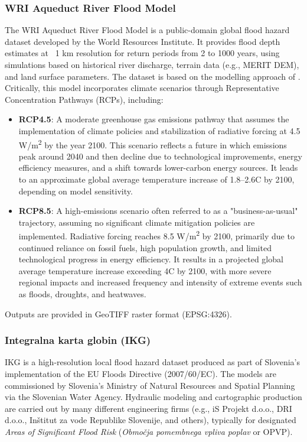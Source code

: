 \subsubsection*{WRI Aqueduct River Flood Model}
The WRI Aqueduct River Flood Model is a public-domain global flood hazard dataset developed by the World Resources Institute. It provides flood depth estimates at ~1 km resolution for return periods from 2 to 1000 years, using simulations based on historical river discharge, terrain data (e.g., MERIT DEM), and land surface parameters. The dataset is based on the modelling approach of \cite{ward_assessing_2013}. Critically, this model incorporates climate scenarios through Representative Concentration Pathways (RCPs), including:
\begin{itemize}
    \item \textbf{RCP4.5}: A moderate greenhouse gas emissions pathway that assumes the implementation of climate policies and stabilization of radiative forcing at 4.5 W/m\textsuperscript{2} by the year 2100. This scenario reflects a future in which emissions peak around 2040 and then decline due to technological improvements, energy efficiency measures, and a shift towards lower-carbon energy sources. It leads to an approximate global average temperature increase of 1.8--2.6\textdegree C by 2100, depending on model sensitivity.
    
    \item \textbf{RCP8.5}: A high-emissions scenario often referred to as a "business-as-usual" trajectory, assuming no significant climate mitigation policies are implemented. Radiative forcing reaches 8.5 W/m\textsuperscript{2} by 2100, primarily due to continued reliance on fossil fuels, high population growth, and limited technological progress in energy efficiency. It results in a projected global average temperature increase exceeding 4\textdegree C by 2100, with more severe regional impacts and increased frequency and intensity of extreme events such as floods, droughts, and heatwaves.
\end{itemize}
Outputs are provided in GeoTIFF raster format (EPSG:4326).

\subsubsection*{Integralna karta globin (IKG)}
IKG is a high-resolution local flood hazard dataset produced as part of Slovenia’s implementation of the EU Floods Directive (2007/60/EC). The models are commissioned by Slovenia’s Ministry of Natural Resources and Spatial Planning via the Slovenian Water Agency. Hydraulic modeling and cartographic production are carried out by many different engineering firms (e.g., iS Projekt d.o.o., DRI d.o.o., Inštitut za vode Republike Slovenije, and others), typically for designated \textit{Areas of Significant Flood Risk} (\textit{Območja pomembnega vpliva poplav} or OPVP).

